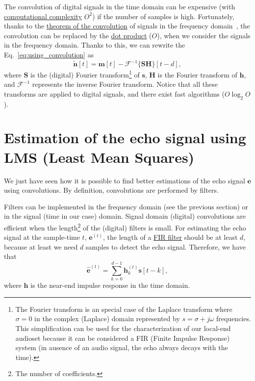 The convolution of digital signals in the time domain can be expensive
(with
\href{https://en.wikipedia.org/wiki/Computational_complexity_theory}{computational
  complexity} $O^2$) if the number of samples is high. Fortunately,
thanks to the \href{https://en.wikipedia.org/wiki/Convolution}{theorem
  of the convolution} of signals in the frequency
domain~\cite{kovacevic2013fourier,Oppenheim2}, the convolution can be
replaced by the \href{https://en.wikipedia.org/wiki/Dot_product}{dot
  product} ($O$), when we consider the signals in the frequency
domain. Thanks to this, we can rewrite the Eq.~\eqref{eq:using_convolution} as
\begin{equation}
  \tilde{\mathbf n}[t] = {\mathbf m}[t] - {\mathcal F}^{-1}\{{\mathbf S}{\mathbf H}\}[t-d],
  \label{eq:faster}
\end{equation}
where ${\mathbf S}$ is the (digital) Fourier transform\footnote{The
  Fourier transform is an special case of the Laplace transform where
  $\sigma=0$ in the complex (Laplace) domain represented by
  $s=\sigma+j\omega$ frequencies. This simplification can be used for
  the characterization of our local-end audioset because it can be
  considered a FIR (Finite Impulse Response) system (in ausence of an
  audio signal, the echo always decays with the time).} of
${\mathbf s}$, ${\mathbf H}$ is the Fourier transform of
${\mathbf h}$, and ${\mathcal F}^{-1}$ represents the inverse Fourier
transform. Notice that all these transforms are applied to digital
signals, and there exist fast algorithms ($O\log_2O$).

\section{Estimation of the echo signal using LMS (Least Mean Squares)}
We just have seen how it is possible to find better estimations of the
echo signal ${\mathbf e}$ using convolutions. By definition,
convolutions are performed by filters.

Filters can be implemented in the frequency domain (see the previous
section) or in the signal (time in our case) domain. Signal domain
(digital) convolutions are efficient when the length\footnote{The
number of coefficients.} of the (digital) filters is small. For
estimating the echo signal at the sample-time $t$, ${\mathbf e}^{(t)}$,
the length of a
\href{https://en.wikipedia.org/wiki/Finite_impulse_response}{FIR
  filter} should be at least $d$, because at least we need $d$ samples
to detect the echo signal. Therefore, we have that
\begin{equation}
  \hat{\mathbf e}^{(t)} = \sum_{k=0}^{d-1}{\mathbf h}_k^{(t)}{\mathbf s}[t-k],
\end{equation}
where ${\mathbf h}$ is the near-end impulse response in the time
domain.


